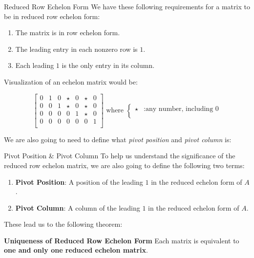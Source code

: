 \documentclass{article}
\begin{document}
\begin{definition}{Reduced Row Echelon Form}
	We have these following requirements for a matrix to be in reduced row echelon form:
	\begin{enumerate}
		\item The matrix is in row echelon form.
		\item The leading entry in each nonzero row is $1$.
		\item Each leading $1$ is the only entry in its column.
	\end{enumerate}

	Visualization of an echelon matrix would be:

	\begin{equation}
		\begin{bmatrix}
			0 & 1 & 0 & \star & 0 & \star & 0 \\
			0 & 0 & 1 & \star & 0 & \star & 0 \\
			0 & 0 & 0 & 0     & 1 & \star & 0 \\
			0 & 0 & 0 & 0     & 0 & 0     & 1 \\
		\end{bmatrix}
		\text{ where }
		\begin{cases}
			\star & : \text{any number, including 0} \\
		\end{cases}
	\end{equation}

	We are also going to need to define what \emph{pivot position} and \emph{pivot column} is:

\end{definition}
\begin{definition}{Pivot Position \& Pivot Column}
	To help us understand the significance of the reduced row echelon matrix, we are also going to define the following two terms:
	\begin{enumerate}[label=\alph*)]
		\item \textbf{Pivot Position}: A position of the leading $1$ in the reduced echelon form of $A$.
		\item \textbf{Pivot Column}: A column of the leading $1$ in the reduced echelon form of $A$.
	\end{enumerate}
\end{definition}

These lead us to the following theorem:

\begin{theorem}{\textbf{Uniqueness of Reduced Row Echelon Form}}
	Each matrix is equivalent to \textbf{one and only one reduced echelon matrix}.
\end{theorem}
\end{document}

